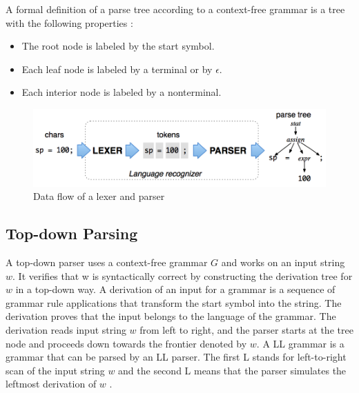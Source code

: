 A formal definition of a parse tree according to a context-free grammar is a tree with the following properties \cite{aho2003compilers}:
\begin{itemize}
    \item The root node is labeled by the start symbol.
    \item Each leaf node is labeled by a terminal or by $\epsilon$.
    \item Each interior node is labeled by a nonterminal.
\end{itemize}

\begin{figure}[H]
  \centering
  \includegraphics[width=1\textwidth]{images/antlr2.png}
  \caption{Data flow of a lexer and parser \cite{parr2013definitive}}
\end{figure}

\subsection{Top-down Parsing}

A top-down parser uses a context-free grammar $G$ and works on an input string $w$. It verifies that w is syntactically correct by constructing the derivation tree for $w$ in a top-down way. A derivation of an input for a grammar is a sequence of grammar rule applications that transform the start symbol into the string. The derivation proves that the input belongs to the language of the grammar. The derivation reads input string $w$ from left to right, and the parser starts at the tree node and proceeds down towards the frontier denoted by $w$. A LL grammar is a grammar that can be parsed by an LL parser. The first L stands for left-to-right scan of the input string $w$ and the second L means that the parser simulates the leftmost derivation of $w$ \cite{meduna2014formal}.
